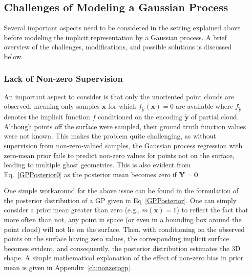     \subsection{Challenges of Modeling a Gaussian Process}
    Several important aspects need to be considered in the setting explained above before modeling the implicit representation by a Gaussian process. A brief overview of the challenges, modifications, and possible solutions is discussed below.

        \subsubsection{Lack of Non-zero Supervision}
        An important aspect to consider is that only the unoriented point clouds are observed, meaning only samples $\mathbf{x}$ for which $f_{\mathbf{\tilde{y}}}(\mathbf{x}) = 0$ are available where $f_{\mathbf{\tilde{y}}}$ denotes the implicit function $f$ conditioned on the encoding $\mathbf{\tilde{y}}$ of partial cloud. Although points off the surface were sampled, their ground truth function values were not known. This makes the problem quite challenging, as without supervision from non-zero-valued samples, the Gaussian process regression with zero-mean prior fails to predict non-zero values for points not on the surface, leading to multiple ghost geometries. This is also evident from Eq.~\ref{GPPosterior0} as the posterior mean becomes zero if $\mathbf{Y}=\mathbf{0}$. 
        \newline

        One simple workaround for the above issue can be found in the formulation of the posterior distribution of a GP given in Eq~\ref{GPPosterior}. One can simply consider a prior mean greater than zero (e.g., $m(\mathbf{x})=1$) to reflect the fact that more often than not, any point in space (or even in a bounding box around the point cloud) will not lie on the surface. Then, with conditioning on the observed points on the surface having zero values, the corresponding implicit surface becomes evident, and consequently, the posterior distribution estimates the 3D shape. A simple mathematical explanation of the effect of non-zero bias in prior mean is given in Appendix~\ref{ch:nonzerogp}.

